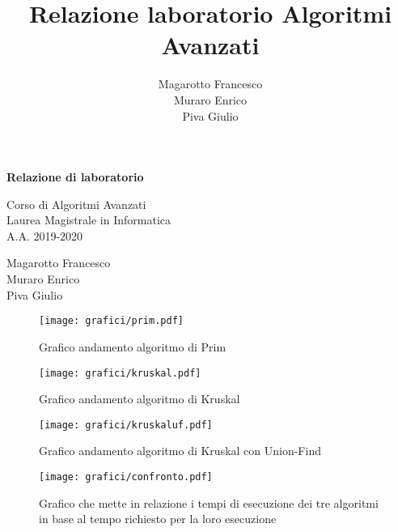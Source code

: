 \documentclass[a4paper]{article}
\title{Relazione laboratorio Algoritmi Avanzati}
\author{Magarotto Francesco\\Muraro Enrico\\Piva Giulio}
\begin{document}
\begin{titlepage}
  \vspace*{5cm}
  \begin{center}
    \Large\bfseries
	Relazione di laboratorio
  \end{center}
  \begin{center}
  \large
  Corso di Algoritmi Avanzati\\
  Laurea Magistrale in Informatica\\A.A. 2019-2020
  \end{center}
  \vspace{4cm plus 1fill}
  \begin{flushleft}
  \large
    Magarotto Francesco\\Muraro Enrico\\Piva Giulio
  \end{flushleft}
\end{titlepage}
\newpage



\begin{figure}[H]
\centering
\texttt{[image: grafici/prim.pdf]}
\caption{Grafico andamento algoritmo di Prim}
\end{figure}

\begin{figure}[H]
\centering
\texttt{[image: grafici/kruskal.pdf]}
\caption{Grafico andamento algoritmo di Kruskal}
\end{figure}

\begin{figure}[H]
\centering
\texttt{[image: grafici/kruskaluf.pdf]}
\caption{Grafico andamento algoritmo di Kruskal con Union-Find}
\end{figure}

\begin{figure}[H]
\centering
\texttt{[image: grafici/confronto.pdf]}
\caption{Grafico che mette in relazione i tempi di esecuzione dei tre algoritmi in base al tempo richiesto per la loro esecuzione}
\end{figure}
\end{document}
